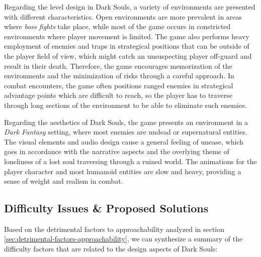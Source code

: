 Regarding the level design in Dark Souls, a variety of environments are presented with different characteristics. Open environments are more prevalent in areas where \emph{boss fights} take place, while most of the game occurs in constricted environments where player movement is limited. The game also performs heavy employment of enemies and traps in strategical positions that can be outside of the player field of view, which might catch an unsuspecting player off-guard and result in their death. Therefore, the game encourages memorization of the environments and the minimization of risks through a careful approach. In combat encounters, the game often positions ranged enemies in strategical advantage points which are difficult to reach, so the player has to traverse through long sections of the environment to be able to eliminate such enemies.  

Regarding the aesthetics of Dark Souls, the game presents an environment in a \emph{Dark Fantasy} setting, where most enemies are undead or supernatural entities. The visual elements and audio design cause a general feeling of unease, which goes in accordance with the narrative aspects and the overlying theme of loneliness of a lost soul traversing through a ruined world. The animations for the player character and most humanoid entities are slow and heavy, providing a sense of weight and realism in combat.

\subsection{Difficulty Issues \& Proposed Solutions}


Based on the detrimental factors to approachability analyzed in section \ref{sec:detrimental-factors-approachability}, we can synthesize a summary of the difficulty factors that are related to the design aspects of Dark Souls:

